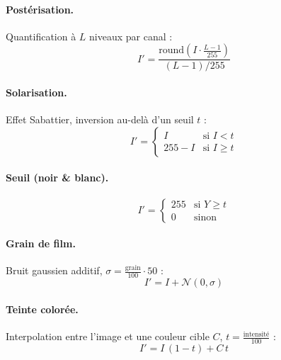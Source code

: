 \documentclass[11pt,a4paper]{article}
\begin{document}
\paragraph{Postérisation.}
Quantification à $L$ niveaux par canal :
\begin{equation}
  I' = \frac{\text{round}\!\left(I \cdot \frac{L-1}{255}\right)}
             {(L-1)/255}
  \label{eq:posterize}
\end{equation}

\paragraph{Solarisation.}
Effet Sabattier, inversion au-delà d'un seuil $t$ :
\begin{equation}
  I' = \begin{cases}
    I & \text{si } I < t \\
    255 - I & \text{si } I \ge t
  \end{cases}
  \label{eq:solarize}
\end{equation}

\paragraph{Seuil (noir \& blanc).}
\begin{equation}
  I' = \begin{cases}
    255 & \text{si } Y \ge t \\
    0 & \text{sinon}
  \end{cases}
  \label{eq:threshold}
\end{equation}

\paragraph{Grain de film.}
Bruit gaussien additif, $\sigma = \frac{\text{grain}}{100}\cdot 50$ :
\begin{equation}
  I' = I + \mathcal{N}(0, \sigma)
  \label{eq:grain}
\end{equation}

\paragraph{Teinte colorée.}
Interpolation entre l'image et une couleur cible $C$,
$t = \frac{\text{intensité}}{100}$ :
\begin{equation}
  I' = I\,(1 - t) + C\,t
  \label{eq:tint}
\end{equation}
\end{document}
